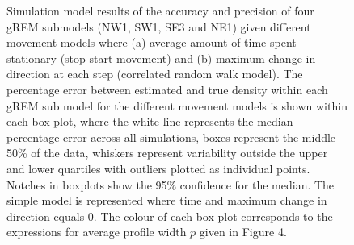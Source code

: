 \begin{knitrout}\footnotesize
{}\color{fgcolor}\begin{figure}[t]

{\centering {}

}

\caption[Simulation model results of the accuracy and precision of four gREM submodels]{
Simulation model results of the accuracy and precision of four gREM submodels (NW1, SW1, SE3 and NE1) given different movement models where (a) average amount of time spent stationary (stop-start movement) and (b) maximum change in direction at each step (correlated random walk model).
The percentage error between estimated and true density within each gREM sub model for the different movement models is shown within each box plot, where the white line represents the median percentage error across all simulations, boxes represent the middle 50\% of the data, whiskers represent variability outside the upper and lower quartiles with outliers plotted as individual points.
Notches in boxplots show the 95\% confidence for the median.
The simple model is represented where time and maximum change in direction equals 0.
The colour of each box plot corresponds to the expressions for average profile width $\bar{p}$ given in Figure 4.
}\label{fig:movtFig}
\end{figure}


\end{knitrout}

